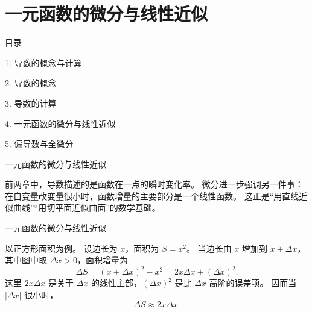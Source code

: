 \documentclass[aspectratio=169,10pt,fontset=fandol]{ctexbeamer}
\begin{document}
\section{一元函数的微分与线性近似}
\begin{frame}[t,fragile]{目录}
\normalsize
{\color{black}\normalsize 1. 导数的概念与计算\par}\vspace{0.22em}
{\color{black}\normalsize 2. 导数的概念\par}\vspace{0.22em}
{\color{black}\normalsize 3. 导数的计算\par}\vspace{0.22em}
{\color{blue}\normalsize 4. 一元函数的微分与线性近似\par}\vspace{0.22em}
{\color{gray!40}\normalsize 5. 偏导数与全微分\par}\vspace{0.22em}
\end{frame}
\begin{frame}[t,fragile]{一元函数的微分与线性近似}
\footnotesize
{\footnotesize
前两章中，导数描述的是函数在一点的瞬时变化率。 微分进一步强调另一件事：在自变量改变量很小时，函数增量的主要部分是一个线性函数。 这正是“用直线近似曲线”“用切平面近似曲面”的数学基础。


}
\end{frame}
\begin{frame}[t,fragile]{一元函数的微分与线性近似}
\footnotesize
{\footnotesize
以正方形面积为例。 设边长为 $x$，面积为 $S=x^2$。 当边长由 $x$ 增加到 $x+\Delta x$，其中图中取 $\Delta x>0$，面积增量为
\[
\Delta S=(x+\Delta x)^2-x^2=2x\Delta x+(\Delta x)^2.
\]
这里 $2x\Delta x$ 是关于 $\Delta x$ 的线性主部，$(\Delta x)^2$ 是比 $\Delta x$ 高阶的误差项。 因而当 $|\Delta x|$ 很小时，
\[
\Delta S\approx 2x\Delta x.
\]


}
\end{frame}
\end{document}
